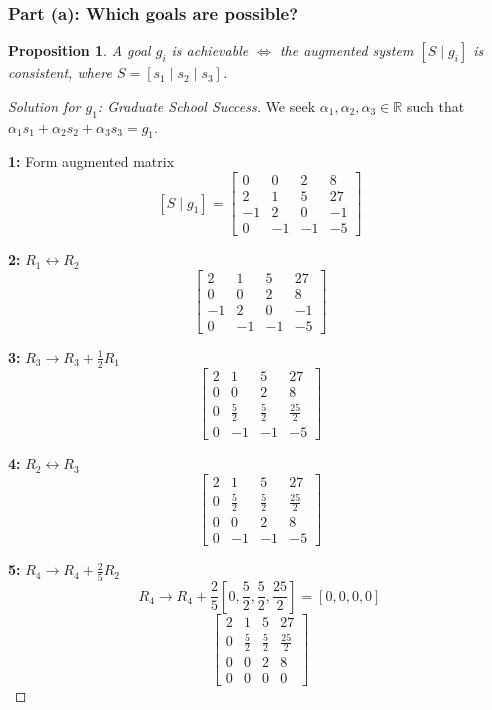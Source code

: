 \documentclass[12pt]{article}
\newtheorem{proposition}{Proposition}
\theoremstyle{definition}
\begin{document}
\subsubsection*{Part (a): Which goals are possible?}

\begin{proposition}
A goal $g_i$ is achievable $\iff$ the augmented system $[S \mid g_i]$ is consistent, where $S = [s_1 \mid s_2 \mid s_3]$.
\end{proposition}

\begin{proof}[Solution for $g_1$: Graduate School Success]
We seek $\alpha_1, \alpha_2, \alpha_3 \in \mathbb{R}$ such that $\alpha_1 s_1 + \alpha_2 s_2 + \alpha_3 s_3 = g_1$.

\textbf{1:} Form augmented matrix
\[
[S \mid g_1] = \left[\begin{array}{ccc|c}
0 & 0 & 2 & 8 \\
2 & 1 & 5 & 27 \\
-1 & 2 & 0 & -1 \\
0 & -1 & -1 & -5
\end{array}\right]
\]

\textbf{2:} $R_1 \leftrightarrow R_2$
\[
\left[\begin{array}{ccc|c}
2 & 1 & 5 & 27 \\
0 & 0 & 2 & 8 \\
-1 & 2 & 0 & -1 \\
0 & -1 & -1 & -5
\end{array}\right]
\]

\textbf{3:} $R_3 \to R_3 + \frac{1}{2}R_1$
\[
\left[\begin{array}{ccc|c}
2 & 1 & 5 & 27 \\
0 & 0 & 2 & 8 \\
0 & \frac{5}{2} & \frac{5}{2} & \frac{25}{2} \\
0 & -1 & -1 & -5
\end{array}\right]
\]

\textbf{4:} $R_2 \leftrightarrow R_3$
\[
\left[\begin{array}{ccc|c}
2 & 1 & 5 & 27 \\
0 & \frac{5}{2} & \frac{5}{2} & \frac{25}{2} \\
0 & 0 & 2 & 8 \\
0 & -1 & -1 & -5
\end{array}\right]
\]

\textbf{5:} $R_4 \to R_4 + \frac{2}{5}R_2$
\[
R_4 \to R_4 + \frac{2}{5}\left[0, \frac{5}{2}, \frac{5}{2}, \frac{25}{2}\right] = \left[0, 0, 0, 0\right]
\]
\[
\left[\begin{array}{ccc|c}
2 & 1 & 5 & 27 \\
0 & \frac{5}{2} & \frac{5}{2} & \frac{25}{2} \\
0 & 0 & 2 & 8 \\
0 & 0 & 0 & 0
\end{array}\right]
\]


\end{proof}
\end{document}

